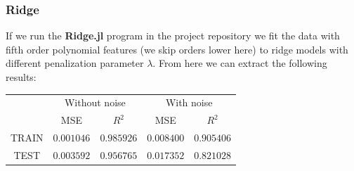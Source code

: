 \documentclass{article}
\begin{document}
\subsubsection{Ridge}
If we run the \textbf{Ridge.jl} program in the project repository
\cite{githubrepoproject1} we fit the data with fifth order polynomial features
(we skip orders lower here) to ridge models with different penalization
parameter $\lambda$. From here we can extract the following
results:\\
\begin{tabular}{| c | c | c | c | c |}
          & \multicolumn{2}{|c|}{Without noise} & \multicolumn{2}{|c|}{With noise}                           \\
          & MSE                                 & $R^2$                            & MSE        & $R^2$      \\
    TRAIN & $0.001046$                          & $0.985926$                       & $0.008400$ & $0.905406$ \\
    TEST  & $0.003592$                          & $0.956765$                       & $0.017352$ & $0.821028$ \\
\end{tabular}
\end{document}
